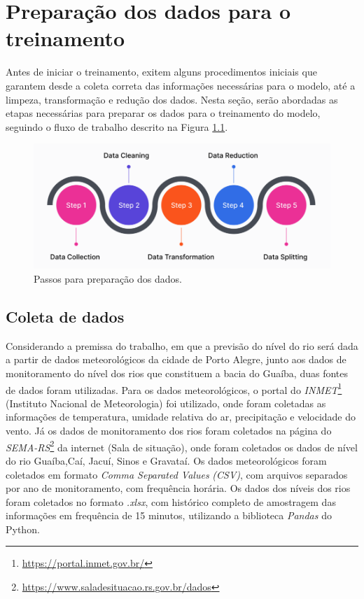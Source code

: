 \chapter{Preparação dos dados para o treinamento}

Antes de iniciar o treinamento, exitem alguns procedimentos iniciais que garantem desde a coleta correta das informações necessárias para o modelo, até a limpeza, transformação e redução dos dados. Nesta seção, serão abordadas as etapas necessárias para preparar os dados para o treinamento do modelo, seguindo o fluxo de trabalho descrito na Figura \ref{fig:passos_preparacao}.

\begin{figure}[H]
	\caption{\label{fig:passos_preparacao}Passos para preparação dos dados.}
	\begin{center}
		\includegraphics[scale=0.4]{figuras/steps_data_preparing.png}
	\end{center}
\end{figure}

\section{Coleta de dados}

Considerando a premissa do trabalho, em que a previsão do nível do rio será dada a partir de dados meteorológicos da cidade de Porto Alegre, junto aos dados de monitoramento do nível dos rios que constituem a bacia do Guaíba, duas fontes de dados foram utilizadas. Para os dados meteorológicos, o portal do \textit{INMET}\footnote{\url{https://portal.inmet.gov.br/}} (Instituto Nacional de Meteorologia) foi utilizado, onde foram coletadas as informações de temperatura, umidade relativa do ar, precipitação e velocidade do vento. Já os dados de monitoramento dos rios foram coletados na página do \textit{SEMA-RS}\footnote{\url{https://www.saladesituacao.rs.gov.br/dados}} da internet (Sala de situação), onde foram coletados os dados de nível do rio Guaíba,Caí, Jacuí, Sinos e Gravataí. Os dados meteorológicos foram coletados em formato \textit{Comma Separated Values} \textit{(CSV)}, com arquivos separados por ano de monitoramento, com frequência horária. Os dados dos níveis dos rios foram coletados no formato \textit{.xlsx}, com histórico completo de amostragem das informações em frequência de 15 minutos, utilizando a biblioteca \textit{Pandas} do Python.

